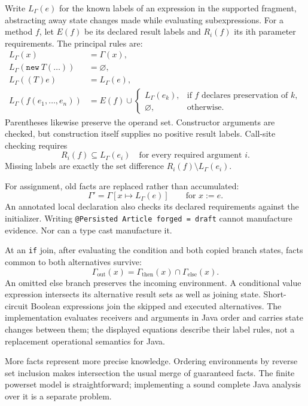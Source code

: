 \documentclass[11pt]{article}
\begin{document}
Write $L_\Gamma(e)$ for the known labels of an expression in the supported
fragment, abstracting away state changes made while evaluating subexpressions.
For a method $f$, let $E(f)$ be its declared result labels and $R_i(f)$ its ith
parameter requirements. The principal rules are:
\begin{align}
L_\Gamma(x) &= \Gamma(x),\\
L_\Gamma(\texttt{new}\ T(\ldots)) &= \varnothing,\\
L_\Gamma((T)e) &= L_\Gamma(e),\\
L_\Gamma(f(e_1,\ldots,e_n)) &= E(f) \cup
\begin{cases}
L_\Gamma(e_k), & \text{if }f\text{ declares preservation of }k,\\
\varnothing, & \text{otherwise}.
\end{cases}
\end{align}
Parentheses likewise preserve the operand set. Constructor arguments are checked,
but construction itself supplies no positive result labels. Call-site checking
requires
\[
R_i(f) \subseteq L_\Gamma(e_i) \quad\text{for every required argument }i.
\]
Missing labels are exactly the set difference
$R_i(f)\setminus L_\Gamma(e_i)$.

For assignment, old facts are replaced rather than accumulated:
\[
\Gamma' = \Gamma[x\mapsto L_\Gamma(e)]
\qquad\text{for }x:=e.
\]
An annotated local declaration also checks its declared requirements against
the initializer. Writing \texttt{@Persisted Article forged = draft} cannot
manufacture evidence. Nor can a type cast manufacture it.

At an \texttt{if} join, after evaluating the condition and both copied branch
states, facts common to both alternatives survive:
\[
\Gamma_{\mathrm{out}}(x)
=\Gamma_{\mathrm{then}}(x)\cap\Gamma_{\mathrm{else}}(x).
\]
An omitted else branch preserves the incoming environment. A conditional value
expression intersects its alternative result sets as well as joining state.
Short-circuit Boolean expressions join the skipped and executed alternatives.
The implementation evaluates receivers and arguments in Java order and carries
state changes between them; the displayed equations describe their label rules,
not a replacement operational semantics for Java.

More facts represent more precise knowledge. Ordering environments by reverse
set inclusion makes intersection the usual merge of guaranteed facts. The
finite powerset model is straightforward; implementing a sound complete Java
analysis over it is a separate problem.
\end{document}
